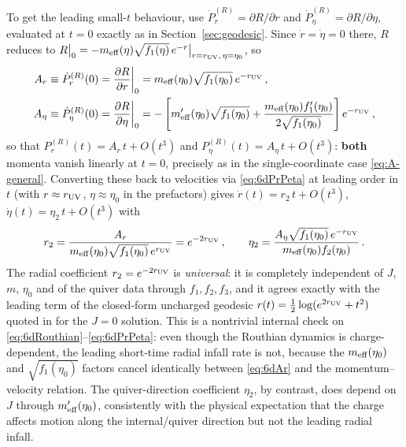 \documentclass[11pt]{article}
\begin{document}
To get the leading small-$t$ behaviour, use $\dot P_r^{(R)}=\partial R/\partial r$ and $\dot P_\eta^{(R)}=\partial R/\partial\eta$, evaluated at $t=0$ exactly as in Section~\ref{sec:geodesic}. Since $\dot r=\dot\eta=0$ there, $R$ reduces to $R\big|_0=-m_{\rm eff}(\eta)\sqrt{f_1(\eta)}\,e^{-r}\big|_{r=r_{\rm UV},\,\eta=\eta_0}$, so
\begin{align}
A_r &\equiv \dot P_r^{(R)}(0)=\frac{\partial R}{\partial r}\bigg|_0= m_{\rm eff}(\eta_0)\sqrt{f_1(\eta_0)}\,e^{-r_{\rm UV}}\,,
\label{eq:6dAr}\\
A_\eta &\equiv \dot P_\eta^{(R)}(0)=\frac{\partial R}{\partial \eta}\bigg|_0= -\left[m_{\rm eff}'(\eta_0)\sqrt{f_1(\eta_0)}+\frac{m_{\rm eff}(\eta_0)f_1'(\eta_0)}{2\sqrt{f_1(\eta_0)}}\right]e^{-r_{\rm UV}}\,,
\label{eq:6dAeta}
\end{align}
so that $P_r^{(R)}(t)=A_r\,t+O(t^3)$ and $P_\eta^{(R)}(t)=A_\eta\,t+O(t^3)$: {\bf both} momenta vanish linearly at $t=0$, precisely as in the single-coordinate case \eqref{eq:A-general}. Converting these back to velocities via \eqref{eq:6dPrPeta} at leading order in $t$ (with $r\approx r_{\rm UV}$, $\eta\approx\eta_0$ in the prefactors) gives $\dot r(t)=r_2\,t+O(t^3)$, $\dot\eta(t)=\eta_2\,t+O(t^3)$ with
\begin{equation}
r_2=\frac{A_r}{m_{\rm eff}(\eta_0)\sqrt{f_1(\eta_0)}\,e^{r_{\rm UV}}}=e^{-2r_{\rm UV}}\,,
\qquad
\eta_2=\frac{A_\eta\sqrt{f_1(\eta_0)}\,e^{-r_{\rm UV}}}{m_{\rm eff}(\eta_0)f_2(\eta_0)}\,.
\label{eq:6dr2eta2}
\end{equation}
The radial coefficient $r_2=e^{-2r_{\rm UV}}$ is \emph{universal}: it is completely independent of $J$, $m$, $\eta_0$ and of the quiver data through $f_1,f_2,f_3$, and it agrees exactly with the leading term of the closed-form uncharged geodesic $r(t)=\tfrac12\log(e^{2r_{\rm UV}}+t^2)$ quoted in \cite{Fatemiabhari:2026rob} for the $J=0$ solution. This is a nontrivial internal check on \eqref{eq:6dRouthian}--\eqref{eq:6dPrPeta}: even though the Routhian dynamics is charge-dependent, the leading short-time radial infall rate is not, because the $m_{\rm eff}(\eta_0)$ and $\sqrt{f_1(\eta_0)}$ factors cancel identically between \eqref{eq:6dAr} and the momentum--velocity relation. The quiver-direction coefficient $\eta_2$, by contrast, does depend on $J$ through $m_{\rm eff}'(\eta_0)$, consistently with the physical expectation that the charge affects motion along the internal/quiver direction but not the leading radial infall.
\end{document}
